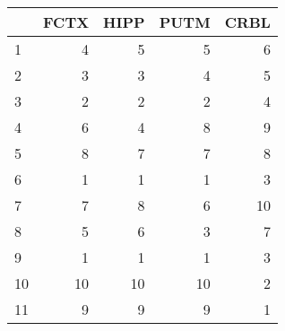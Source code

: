 \begin{tabular}{lrrrr}
  \hline
 & FCTX & HIPP & PUTM & CRBL \\ 
  \hline
1 & 4 & 5 & 5 & 6 \\ 
  2 & 3 & 3 & 4 & 5 \\ 
  3 & 2 & 2 & 2 & 4 \\ 
  4 & 6 & 4 & 8 & 9 \\ 
  5 & 8 & 7 & 7 & 8 \\ 
  6 & 1 & 1 & 1 & 3 \\ 
  7 & 7 & 8 & 6 & 10 \\ 
  8 & 5 & 6 & 3 & 7 \\ 
  9 & 1 & 1 & 1 & 3 \\ 
  10 & 10 & 10 & 10 & 2 \\ 
  11 & 9 & 9 & 9 & 1 \\ 
   \hline
\end{tabular}
